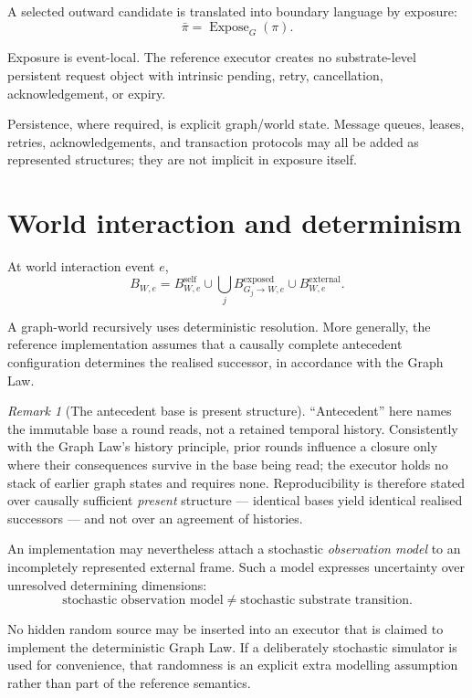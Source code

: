 \documentclass[11pt,a4paper]{article}
\theoremstyle{remark}
\newtheorem{remark}[theorem]{Remark}
\begin{document}
A selected outward candidate is translated into boundary language by exposure:
\[
\bar\pi=\operatorname{Expose}_G(\pi).
\]

Exposure is event-local. The reference executor creates no substrate-level persistent request object with intrinsic pending, retry, cancellation, acknowledgement, or expiry.

Persistence, where required, is explicit graph/world state. Message queues, leases, retries, acknowledgements, and transaction protocols may all be added as represented structures; they are not implicit in exposure itself.

\section{World interaction and determinism}\label{sec:world}

At world interaction event $e$,
\[
B_{W,e}
=
B_{W,e}^{\mathrm{self}}
\cup
\bigcup_j
B_{G_j\rightarrow W,e}^{\mathrm{exposed}}
\cup
B_{W,e}^{\mathrm{external}}.
\]

A graph-world recursively uses deterministic resolution. More generally, the reference implementation assumes that a causally complete antecedent configuration determines the realised successor, in accordance with the Graph Law.

\begin{remark}[The antecedent base is present structure]\label{rem:base-is-present}
``Antecedent'' here names the immutable base a round reads, not a retained temporal history. Consistently with the Graph Law's history principle, prior rounds influence a closure only where their consequences survive in the base being read; the executor holds no stack of earlier graph states and requires none. Reproducibility is therefore stated over causally sufficient \emph{present} structure --- identical bases yield identical realised successors --- and not over an agreement of histories.
\end{remark}

An implementation may nevertheless attach a stochastic \emph{observation model} to an incompletely represented external frame. Such a model expresses uncertainty over unresolved determining dimensions:
\[
\boxed{
\text{stochastic observation model}
\neq
\text{stochastic substrate transition}.
}
\]

No hidden random source may be inserted into an executor that is claimed to implement the deterministic Graph Law. If a deliberately stochastic simulator is used for convenience, that randomness is an explicit extra modelling assumption rather than part of the reference semantics.
\end{document}
